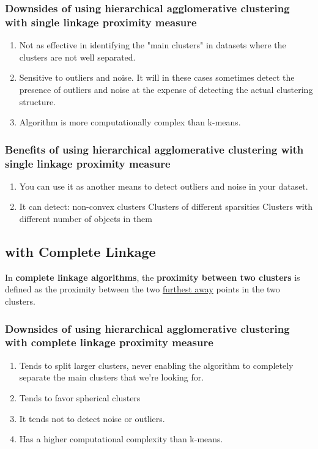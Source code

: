 \documentclass[11pt]{elegantbook}
\begin{document}
\subsubsection*{Downsides of using hierarchical agglomerative clustering with single linkage proximity measure}
\begin{enumerate}
    \item Not as effective in identifying the "main clusters" in datasets where the clusters are not well separated.
    \item Sensitive to outliers and noise. It will in these cases sometimes detect the presence of outliers and noise at the expense of detecting the actual clustering structure.
    \item Algorithm is more computationally complex than k-means.
\end{enumerate}

\subsubsection*{Benefits of using hierarchical agglomerative clustering with single linkage proximity measure}
\begin{enumerate}
    \item You can use it as another means to detect outliers and noise in your dataset.
    \item It can detect:
    \subitem non-convex clusters
    \subitem Clusters of different sparsities
    \subitem Clusters with different number of objects in them
\end{enumerate}

\subsection{with Complete Linkage}
In \textbf{complete linkage algorithms}, the \textbf{proximity between two clusters} is defined as the proximity between the two \underline{furthest away} points in the two clusters.
\subsubsection*{Downsides of using hierarchical agglomerative clustering with complete linkage proximity measure}
\begin{enumerate}[1.]
    \item Tends to split larger clusters, never enabling the algorithm to completely separate the main clusters that we're looking for.
    \item Tends to favor spherical clusters
    \item It tends not to detect noise or outliers.
    \item Has a higher computational complexity than k-means.
\end{enumerate}
\end{document}
